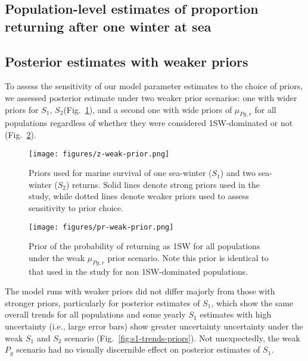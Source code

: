 \documentclass[12pt]{article}
\newcommand{\So}{$S_{1}$\xspace}
\newcommand{\St}{$S_{2}$\xspace}
\newcommand{\Pg}{$P_g$\xspace}
\newcommand{\prmu}{$\mu_{Pg,r}$\xspace}
\begin{document}
\clearpage

\subsection*{Population-level estimates of proportion returning after one winter at sea}



\hspace{8em}



\clearpage

\subsection*{Posterior estimates with weaker priors}

To assess the sensitivity of our model parameter estimates to the choice of
priors, we assessed posterior estimate under two weaker prior scenarios:
one with wider priors for \So, \St (Fig.~\ref{fig:zweak}), and a second one with wide priors
of \prmu for all populations regardless of whether they were considered
1SW-dominated or not (Fig.~\ref{fig:prweak}).

\begin{figure}[htbp] \centering
    \texttt{[image: figures/z-weak-prior.png]}
    \caption{Priors used for marine survival of one sea-winter (\So) and two
        sea-winter (\St) returns. Solid lines denote strong priors used in the
        study, while dotted lines denote weaker priors used to assess
        sensitivity to prior choice.} \label{fig:zweak} \end{figure}

\begin{figure}[htbp] \centering
    \texttt{[image: figures/pr-weak-prior.png]}
    \caption{Prior of the probability of returning as 1SW for all populations
        under the weak \prmu prior scenario. Note this prior is identical to
        that used in the study for non 1SW-dominated populations.}
    \label{fig:prweak} \end{figure}

The model runs with weaker priors did not differ majorly from those with
stronger priors, particularly for posterior estimates of \So, which show the
same overall trends for all populations and some yearly \So estimates with
high uncertainty (i.e., large error bars) show greater uncertainty uncertainty
under the weak \So and \St scenario (Fig.~\ref{fig:s1-trends-priors}).
Not unexpectedly, the weak \Pg scenario had no visually discernible effect on
posterior estimates of \So.
\end{document}
